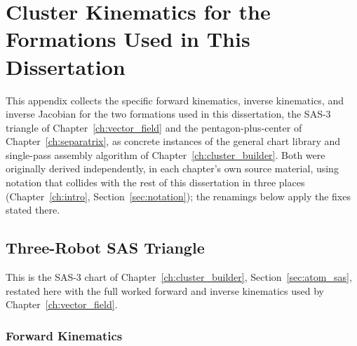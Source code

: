 \documentclass[12pt, letterpaper, oneside]{report}
\begin{document}
\chapter{Cluster Kinematics for the Formations Used in This Dissertation}
\label{app:cluster_kinematics}

This appendix collects the specific forward kinematics, inverse kinematics,
and inverse Jacobian for the two formations used in this dissertation, the
SAS-3 triangle of Chapter~\ref{ch:vector_field} and the pentagon-plus-center
of Chapter~\ref{ch:separatrix}, as concrete instances of the general chart
library and single-pass assembly algorithm of Chapter~\ref{ch:cluster_builder}.
Both were originally derived independently, in each chapter's own source
material, using notation that collides with the rest of this dissertation in
three places (Chapter~\ref{ch:intro}, Section~\ref{sec:notation}); the
renamings below apply the fixes stated there.

\section{Three-Robot SAS Triangle}
\label{app:sas_kinematics}

This is the SAS-3 chart of Chapter~\ref{ch:cluster_builder},
Section~\ref{sec:atom_sas}, restated here with the full worked forward and
inverse kinematics used by Chapter~\ref{ch:vector_field}.

\subsection{Forward Kinematics}
\end{document}
